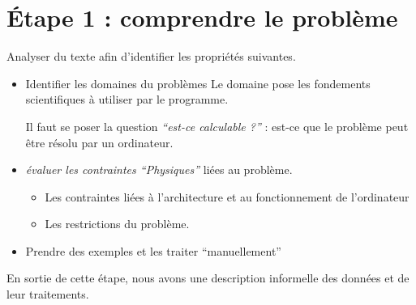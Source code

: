 \documentclass[12pt,a4paper,openany]{book}
\begin{document}
		\section{\'Etape 1 : comprendre le problème}
			Analyser du texte afin d'identifier les propriétés suivantes.
			\begin{itemize}
				\item Identifier les domaines du problèmes
			Le domaine pose les fondements scientifiques à utiliser par le programme. 
						\newpage

						Il faut se poser la question \textit{``est-ce calculable ?''} : est-ce que le problème peut être résolu par un ordinateur.

			\item \textit{évaluer les contraintes ``Physiques''} liées au problème. 
				\begin{itemize}
					\item Les contraintes liées à l'architecture et au fonctionnement de l'ordinateur
					\item Les restrictions du problème.
				\end{itemize}

			\item Prendre des exemples et les traiter ``manuellement''
			\end{itemize}	

			En sortie de cette étape, nous avons une description informelle des données et de leur traitements.
\end{document}
